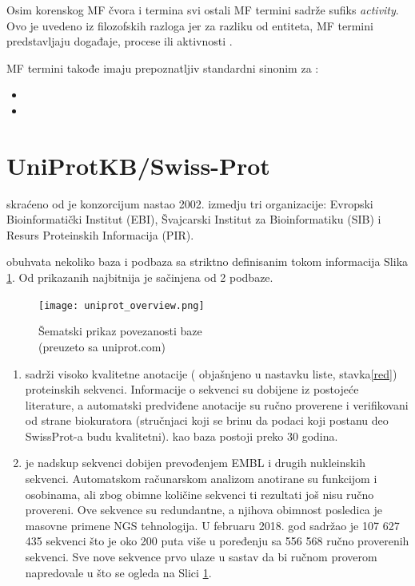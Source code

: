 Osim korenskog MF čvora i  termina svi ostali MF termini sadrže sufiks \textit{activity}.
Ovo je uvedeno iz filozofskih razloga jer za razliku od entiteta, MF termini predstavljaju događaje, procese ili aktivnosti \parencite{go_mf}.

MF termini takođe imaju prepoznatljiv standardni sinonim za  \parencite{go_mf}:
\begin{itemize}
  \item {}
  \item {}
\end{itemize}


\section{UniProtKB/Swiss-Prot}
\label{svis-prot}

\keyword{\uniprot} skraćeno od  je konzorcijum
nastao 2002. izmedju tri organizacije: Evropski Bioinformatički
Institut (EBI), Švajcarski Institut za Bioinformatiku (SIB) i Resurs
Proteinskih Informacija (PIR).  


\uniprot obuhvata nekoliko baza i podbaza sa striktno definisanim tokom
informacija Slika \ref{fig:uniprot_overview}. Od prikazanih najbitnija je
\keyword{\uniprotkb}  sačinjena od 2 podbaze.

\begin{figure}[h!]
  \centering
  \texttt{[image: uniprot\_overview.png]}
  \caption{Šematski prikaz povezanosti \uniprot baze\\ \footnotesize (preuzeto sa uniprot.com)}
  \label{fig:uniprot_overview}
\end{figure}


\begin{enumerate}
  \item \keyword{\swissprot}  sadrži visoko kvalitetne anotacije
     ( objašnjeno u nastavku liste, stavka\ref{red}) proteinskih sekvenci.
    Informacije o sekvenci su dobijene iz postojeće literature, a automatski
    predviđene anotacije su ručno proverene i verifikovani od strane biokuratora
    (stručnjaci koji se brinu da podaci koji postanu deo SwissProt-a budu kvalitetni).
    \swissprot kao baza postoji preko 30 godina.

  \item \trembl {} je nadskup \swissprot sekvenci 
    dobijen prevođenjem EMBL i drugih nukleinskih sekvenci. Automatskom
    računarskom analizom anotirane su funkcijom i osobinama, ali zbog obimne
    količine sekvenci ti rezultati još nisu ručno provereni.  Ove sekvence su
    redundantne, a njihova obimnost posledica je masovne primene NGS
    tehnologija. U februaru 2018. god \trembl sadržao je 107 627 435 sekvenci
    što je oko 200 puta više u poređenju sa 556 568 ručno proverenih \swissprot
    sekvenci. Sve nove sekvence prvo ulaze u sastav \trembl da bi ručnom
    proverom napredovale u \swissprot što se ogleda na Slici
    \ref{fig:uniprot_overview}.
\end{enumerate}





